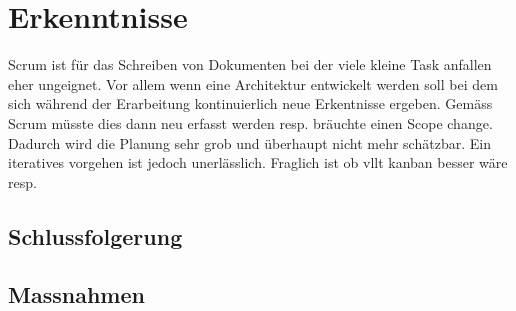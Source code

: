 \chapter{Erkenntnisse}

Scrum ist für das Schreiben von Dokumenten bei der viele kleine Task anfallen eher ungeignet. Vor allem wenn eine Architektur entwickelt werden soll bei dem sich während der Erarbeitung kontinuierlich
neue Erkentnisse ergeben. Gemäss Scrum müsste dies dann neu erfasst werden resp. bräuchte einen Scope change. Dadurch wird die Planung sehr grob und überhaupt nicht mehr schätzbar. Ein iteratives vorgehen ist jedoch unerlässlich. Fraglich ist ob vllt kanban besser wäre resp.

\section{Schlussfolgerung}

\section{Massnahmen}